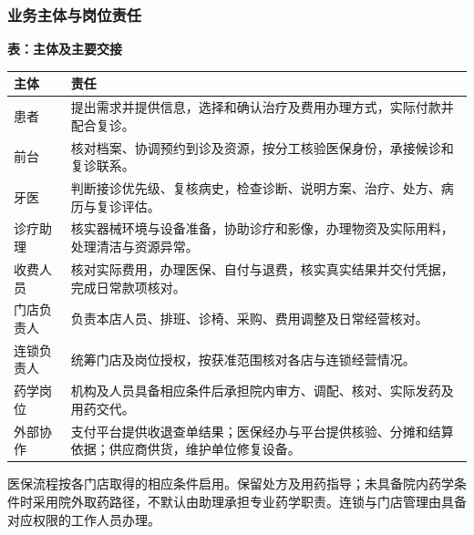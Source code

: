 \documentclass[UTF8,a4paper,zihao=-4,fontset=none]{ctexart}
\begin{document}
\subsubsection{业务主体与岗位责任}
{\small\setlength{\tabcolsep}{3pt}\renewcommand{\arraystretch}{1.13}
\noindent\textbf{表\thetable：主体及主要交接}\par\smallskip
\noindent\begin{tabular}{@{}>{\raggedright\arraybackslash}p{3.14cm}>{\raggedright\arraybackslash}p{12.56cm}@{}}
\toprule
主体 & 责任 \\ \midrule
患者 & 提出需求并提供信息，选择和确认治疗及费用办理方式，实际付款并配合复诊。 \\
前台 & 核对档案、协调预约到诊及资源，按分工核验医保身份，承接候诊和复诊联系。 \\
牙医 & 判断接诊优先级、复核病史，检查诊断、说明方案、治疗、处方、病历与复诊评估。 \\
诊疗助理 & 核实器械环境与设备准备，协助诊疗和影像，办理物资及实际用料，处理清洁与资源异常。 \\
收费人员 & 核对实际费用，办理医保、自付与退费，核实真实结果并交付凭据，完成日常款项核对。 \\
门店负责人 & 负责本店人员、排班、诊椅、采购、费用调整及日常经营核对。\\
连锁负责人 & 统筹门店及岗位授权，按获准范围核对各店与连锁经营情况。 \\
药学岗位 & 机构及人员具备相应条件后承担院内审方、调配、核对、实际发药及用药交代。 \\
外部协作 & 支付平台提供收退查单结果；医保经办与平台提供核验、分摊和结算依据；供应商供货，维护单位修复设备。 \\
\bottomrule
\end{tabular}\par}
\medskip
医保流程按各门店取得的相应条件启用。保留处方及用药指导；未具备院内药学条件时采用院外取药路径，不默认由助理承担专业药学职责。连锁与门店管理由具备对应权限的工作人员办理。\par

\clearpage
\end{document}
